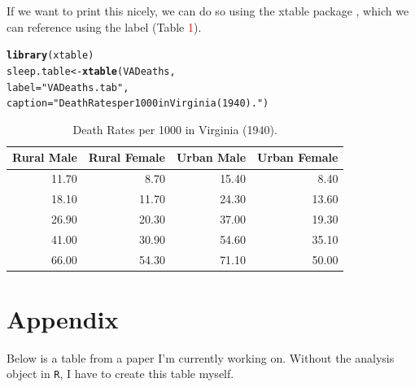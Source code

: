\documentclass{article}\usepackage[]{graphicx}\usepackage[]{xcolor}
\makeatletter
\newcommand{\hlsng}[1]{\textcolor[rgb]{0.192,0.494,0.8}{#1}}%
\newcommand{\hldef}[1]{\textcolor[rgb]{0.345,0.345,0.345}{#1}}%
\newcommand{\hlkwb}[1]{\textcolor[rgb]{0.69,0.353,0.396}{#1}}%
\newcommand{\hlkwc}[1]{\textcolor[rgb]{0.333,0.667,0.333}{#1}}%
\newcommand{\hlkwd}[1]{\textcolor[rgb]{0.737,0.353,0.396}{\textbf{#1}}}%
\newenvironment{kframe}{%
 \def\at@end@of@kframe{}%
 \ifinner\ifhmode%
  \def\at@end@of@kframe{\end{minipage}}%
  \begin{minipage}{\columnwidth}%
 \fi\fi%
 \def\FrameCommand##1{\hskip\@totalleftmargin \hskip-\fboxsep
 \colorbox{shadecolor}{##1}\hskip-\fboxsep
     \hskip-\linewidth \hskip-\@totalleftmargin \hskip\columnwidth}%
 \MakeFramed {\advance\hsize-\width
   \@totalleftmargin\z@ \linewidth\hsize
   \@setminipage}}%
 {\par\unskip\endMakeFramed%
 \at@end@of@kframe}
\newenvironment{knitrout}{}{} %
\makeatother
\begin{document}
\begin{multicols}{2}
 If we want to print this nicely, we can do so using the
 xtable package \citep{xtable}, which we can reference
 using the label (Table \textcolor{red}{1}).
 
\begin{knitrout}
\color{fgcolor}\begin{kframe}
\begin{alltt}
\hlkwd{library}\hldef{(xtable)}
\hldef{sleep.table}\hlkwb{<-}\hlkwd{xtable}\hldef{(VADeaths,}
    \hlkwc{label}\hldef{=}\hlsng{"VADeaths.tab"}\hldef{,}
    \hlkwc{caption}\hldef{=}\hlsng{"Death Rates per 1000 in Virginia (1940)."}\hldef{)}
\end{alltt}
\end{kframe}
\end{knitrout}
 
\begin{table}[H]
\centering
\begingroup\small
\begin{tabular}{rrrr}
  \hline
Rural Male & Rural Female & Urban Male & Urban Female \\ 
  \hline
11.70 & 8.70 & 15.40 & 8.40 \\ 
  18.10 & 11.70 & 24.30 & 13.60 \\ 
  26.90 & 20.30 & 37.00 & 19.30 \\ 
  41.00 & 30.90 & 54.60 & 35.10 \\ 
  66.00 & 54.30 & 71.10 & 50.00 \\ 
   \hline
\end{tabular}
\endgroup
\caption{Death Rates per 1000 in Virginia (1940).} 
\label{VADeaths.tab}
\end{table}


\begin{tiny}

\end{tiny}

\pagebreak

\end{multicols}

\section{Appendix}
 Below is a table from a paper I’m currently working on. Without the analysis object in \texttt{R}, I have to create this table myself.
\end{document}
